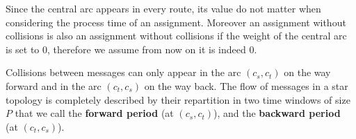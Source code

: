 \documentclass[a4paper,10pt]{article}
\begin{document}
{      
       \begin{center}

  \end{center}
	
      Since the central arc appears in every route, its value do not matter when considering the process time of an assignment.
      Moreover an assignment without collisions is also an assignment without collisions if the weight of the central arc 
      is set to $0$, therefore we assume from now on it is indeed $0$.
      
      
      Collisions between messages can only appear in the arc $(c_s,c_t)$ on the way forward and in the arc $(c_t,c_s)$
      on the way back. The flow of messages in a star topology is completely described by their repartition in two 
      time windows of size $P$ that we call the {\bf forward period} (at $(c_s,c_t)$), and the {\bf backward period} (at $(c_t,c_s)$).
      
%       
% 

}
\end{document}

